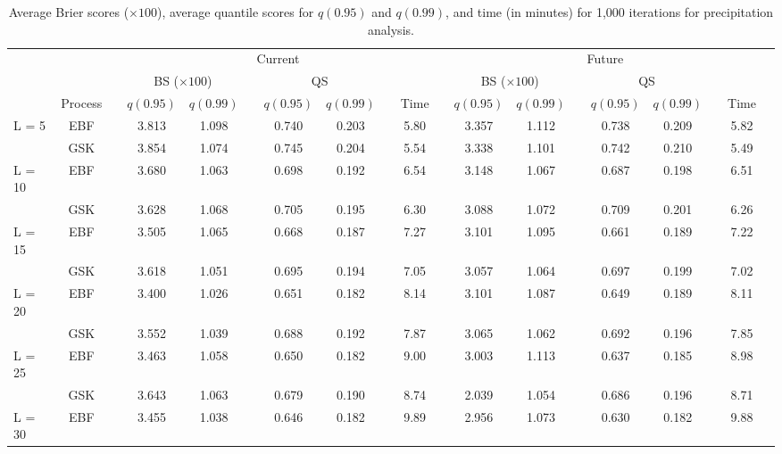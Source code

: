 \documentclass[11pt]{article}
\begin{document}
\begin{landscape}
\begin{table}
\caption{Average Brier scores ($\times 100$), average quantile scores for $q(0.95)$ and $q(0.99)$, and time (in minutes) for 1,000 iterations for precipitation analysis.}
\label{ebtbl:precip-scores}
\small
\centering
  \begin{tabular}{lcc c cc c cc c r c cc c cc c r}
  \toprule
  & && \multicolumn{7}{c}{Current} && \multicolumn{7}{c}{Future}  \\
  \cmidrule{4-10} \cmidrule{12-18}
  & & \phantom{a} & \multicolumn{2}{c}{BS ($\times 100$)} & \phantom{ab} & \multicolumn{2}{c}{QS} & \phantom{a} && \phantom{abcd} & \multicolumn{2}{c}{BS ($\times 100$)} & \phantom{ab} & \multicolumn{2}{c}{QS} & \phantom{a} &&\\
  \cmidrule{4-5} \cmidrule{7-8} \cmidrule{12-13} \cmidrule{15-16}
  & Process && $q(0.95)$ & $q(0.99)$ && $q(0.95)$ & $q(0.99)$ && Time && $q(0.95)$ & $q(0.99)$ && $q(0.95)$ & $q(0.99)$ &&  Time \\
  \midrule
  L = 5  & EBF && 3.813 & 1.098 && 0.740 & 0.203 && 5.80 && 3.357 & 1.112 && 0.738 & 0.209 && 5.82\\
         & GSK && 3.854 & 1.074 && 0.745 & 0.204 && 5.54 && 3.338 & 1.101 && 0.742 & 0.210 && 5.49\\
  \midrule
  L = 10 & EBF && 3.680 & 1.063 && 0.698 & 0.192 && 6.54 && 3.148 & 1.067 && 0.687 & 0.198 && 6.51\\
         & GSK && 3.628 & 1.068 && 0.705 & 0.195 && 6.30 && 3.088 & 1.072 && 0.709 & 0.201 && 6.26\\
  \midrule
  L = 15 & EBF && 3.505 & 1.065 && 0.668 & 0.187 && 7.27 && 3.101 & 1.095 && 0.661 & 0.189 && 7.22\\
         & GSK && 3.618 & 1.051 && 0.695 & 0.194 && 7.05 && 3.057 & 1.064 && 0.697 & 0.199 && 7.02\\
  \midrule
  L = 20 & EBF && 3.400 & 1.026 && 0.651 & 0.182 && 8.14 && 3.101 & 1.087 && 0.649 & 0.189 && 8.11\\
         & GSK && 3.552 & 1.039 && 0.688 & 0.192 && 7.87 && 3.065 & 1.062 && 0.692 & 0.196 && 7.85\\
  \midrule
  L = 25 & EBF && 3.463 & 1.058 && 0.650 & 0.182 && 9.00 && 3.003 & 1.113 && 0.637 & 0.185 && 8.98\\
         & GSK && 3.643 & 1.063 && 0.679 & 0.190 && 8.74 && 2.039 & 1.054 && 0.686 & 0.196 && 8.71\\
  \midrule
  L = 30 & EBF && 3.455 & 1.038 && 0.646 & 0.182 && 9.89 && 2.956 & 1.073 && 0.630 & 0.182 && 9.88\\

\end{tabular}
\end{table}
\end{landscape}
\end{document}
